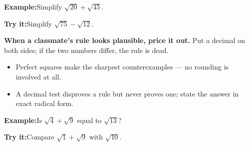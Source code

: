 \documentclass[12pt]{article}
\begin{document}
\begin{examplebox}
\textbf{Example:}\quad Simplify $\sqrt{20} + \sqrt{45}$.
\end{examplebox}

\begin{tryitbox}
\textbf{Try it:}\quad Simplify $\sqrt{75} - \sqrt{12}$.\\[2pt]
\end{tryitbox}


\begin{formulabox}
\textbf{When a classmate's rule looks plausible, price it out.} Put a decimal on both sides; if the two numbers differ, the rule is dead.
\begin{itemize}[leftmargin=0.8cm, itemsep=0pt, topsep=1pt]
  \item Perfect squares make the sharpest counterexamples --- no rounding is involved at all.
  \item A decimal test disproves a rule but never proves one; state the answer in exact radical form.
\end{itemize}
\end{formulabox}

\begin{examplebox}
\textbf{Example:}\quad Is $\sqrt{4} + \sqrt{9}$ equal to $\sqrt{13}$?
\end{examplebox}

\begin{tryitbox}
\textbf{Try it:}\quad Compare $\sqrt{1} + \sqrt{9}$ with $\sqrt{10}$.\\[2pt]
\end{tryitbox}
\end{document}
